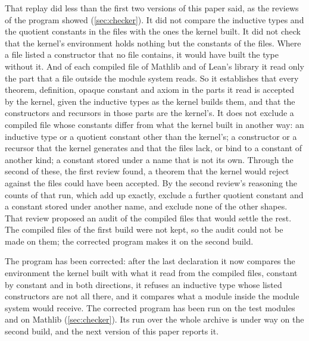 \replaystatus

That replay did less than the first two versions of this paper said, as the reviews of the
program showed (\cref{sec:checker}). It did not compare the inductive types and the quotient
constants in the files with the ones the kernel built. It did not check that the kernel's
environment holds nothing but the constants of the files. Where a file listed a
constructor that no file contains, it would have built the type without it. And of each
compiled file of Mathlib and of Lean's library it read only the part that a file outside the
module system reads. So it establishes that every theorem, definition, opaque constant and
axiom in the parts it read is accepted by the kernel, given the inductive types as the kernel
builds them, and that the constructors and recursors in those parts are the kernel's. It
does not exclude a compiled file whose constants differ from what the kernel built in
another way: an inductive type or a quotient constant other than the kernel's; a constructor
or a recursor that the kernel generates and that the files lack, or bind to a constant of
another kind; a constant stored under a name that is not its own. Through the second of
these, the first review found, a theorem that the kernel would reject against the files
could have been accepted. By the second review's reasoning the counts of that run, which add
up exactly, exclude a further quotient constant and a constant stored under another name,
and exclude none of the other shapes. That review proposed an audit of the compiled files
that would settle the rest. The compiled files of the first build were not kept, so the
audit could not be made on them; the corrected program makes it on the second build.

The program has been
corrected: after the last declaration it now compares the environment the kernel built with
what it read from the compiled files, constant by constant and in both directions, it
refuses an inductive type whose listed constructors are not all there, and it compares what
a module inside the module system would receive. The corrected program
has been run on the test modules and on Mathlib (\cref{sec:checker}). Its run over the whole
archive is under way on the second build, and the next version of this paper reports it.
\fi

